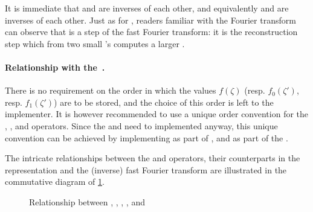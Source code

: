 It is immediate that \polsplit and \polmerge are inverses of each other, and equivalently \splitfft and \mergefft are inverses of each other. Just as for \splitfft, readers familiar with the Fourier transform can observe that \mergefft is a step of the fast Fourier transform: it is the reconstruction step which from two small \fft's computes a larger \fft.

\paragraph{Relationship with the \fft.} There is no requirement on the order in which the values $f(\zeta)$ (resp. $f_0(\zeta')$, resp. $f_1(\zeta')$) are to be stored, and the choice of this order is left to the implementer. It is however recommended to use a unique order convention for the \fft, \ifft, \splitfft and \mergefft operators. Since the \fft and \ifft need to implemented anyway, this unique convention can be achieved \eg by implementing \splitfft as part of \ifft, and \mergefft as part of the \fft.


The intricate relationships between the \polsplit and \polmerge operators, their counterparts in the \fft representation and the (inverse) fast Fourier transform are illustrated in the commutative diagram of \cref{fig:splitmerge}.

\begin{figure}%
\centering
{}
\caption{Relationship between \fft, \ifft, \polsplit, \polmerge, \splitfft and \mergefft}\label{fig:splitmerge}
\end{figure}

